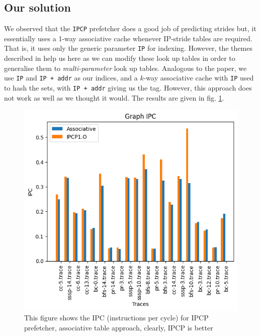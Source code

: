 \documentclass[conference]{IEEEtran}
\begin{document}
\subsection{Our solution}
We observed that the \verb|IPCP| prefetcher does a good job of predicting strides but, it essentially uses a 1-way associative cache whenever IP-stride tables are required. That is, it uses only the generic parameter \verb|IP| for indexing. However, the themes described in \cite{b2} help us here as we can modify these look up tables in order to generalise them to \textit{multi-parameter} look up tables. Analogous to the paper, we use \verb|IP| and \verb|IP + addr| as our indices, and a $k$-way associative cache with \verb|IP| used to hash the sets, with \verb|IP + addr| giving us the tag. However, this approach does not work as well as we thought it would. The results are given in fig. \ref{graph_rel_ipc_ass}.
\begin{figure}
\includegraphics[scale=0.5]{Images/associative.png}
\caption{This figure shows the IPC (instructions per cycle) for IPCP prefetcher, associative table approach, clearly, IPCP is better}
\label{graph_rel_ipc_ass}
\end{figure}
\end{document}
